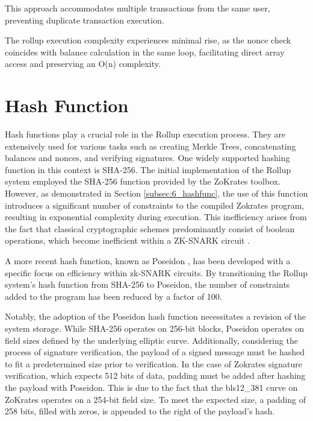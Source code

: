 This approach accommodates multiple transactions from the same user, preventing duplicate transaction execution.

The rollup execution complexity experiences minimal rise, as the nonce check coincides with balance calculation in the same loop, facilitating direct array access and preserving an O(n) complexity.

\section{Hash Function}

Hash functions play a crucial role in the Rollup execution process. They are extensively used for various tasks such as creating Merkle Trees, concatenating balances and nonces, and verifying signatures. One widely supported hashing function in this context is SHA-256. The initial implementation of the Rollup system employed the SHA-256 function provided by the ZoKrates toolbox. However, as demonstrated in Section \ref{subsec:6_hashfunc}, the use of this function introduces a significant number of constraints to the compiled Zokrates program, resulting in exponential complexity during execution. This inefficiency arises from the fact that classical cryptographic schemes predominantly consist of boolean operations, which become inefficient within a ZK-SNARK circuit \cite{belles-munoz_twisted_2021}.

A more recent hash function, known as Poseidon \cite{grassi_poseidon_nodate}, has been developed with a specific focus on efficiency within zk-SNARK circuits. By transitioning the Rollup system's hash function from SHA-256 to Poseidon, the number of constraints added to the program has been reduced by a factor of 100.

Notably, the adoption of the Poseidon hash function necessitates a revision of the system storage. While SHA-256 operates on 256-bit blocks, Poseidon operates on field sizes defined by the underlying elliptic curve. Additionally, considering the process of signature verification, the payload of a signed message must be hashed to fit a predetermined size prior to verification. In the case of Zokrates signature verification, which expects 512 bits of data, padding must be added after hashing the payload with Poseidon. This is due to the fact that the bls12\_381 curve on ZoKrates operates on a 254-bit field size. To meet the expected size, a padding of 258 bits, filled with zeros, is appended to the right of the payload's hash.

